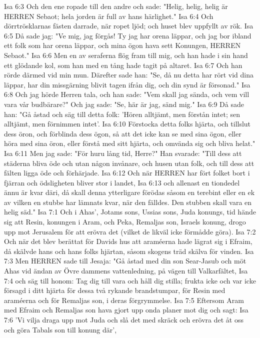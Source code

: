 Isa 6:3  Och den ene ropade till den andre och sade: "Helig, helig, helig är HERREN Sebaot; hela jorden är full av hans härlighet."
Isa 6:4  Och dörrtrösklarnas fästen darrade, när ropet ljöd; och huset blev uppfyllt av rök.
Isa 6:5  Då sade jag: "Ve mig, jag förgås! Ty jag har orena läppar, och jag bor ibland ett folk som har orena läppar, och mina ögon hava sett Konungen, HERREN Sebaot."
Isa 6:6  Men en av seraferna flög fram till mig, och han hade i sin hand ett glödande kol, som han med en tång hade tagit på altaret.
Isa 6:7  Och han rörde därmed vid min mun. Därefter sade han: "Se, då nu detta har rört vid dina läppar, har din missgärning blivit tagen ifrån dig, och din synd är försonad."
Isa 6:8  Och jag hörde Herren tala, och han sade: "Vem skall jag sända, och vem vill vara vår budbärare?" Och jag sade: "Se, här är jag, sänd mig."
Isa 6:9  Då sade han: "Gå åstad och säg till detta folk: 'Hören alltjämt, men förstån intet; sen alltjämt, men förnimmen intet'.
Isa 6:10  Förstocka detta folks hjärta, och tillslut dess öron, och förblinda dess ögon, så att det icke kan se med sina ögon, eller höra med sina öron, eller förstå med sitt hjärta, och omvända sig och bliva helat."
Isa 6:11  Men jag sade: "För huru lång tid, Herre?" Han svarade: "Till dess att städerna bliva öde och utan någon invånare, och husen utan folk, och till dess att fälten ligga öde och förhärjade.
Isa 6:12  Och när HERREN har fört folket bort i fjärran och ödsligheten bliver stor i landet,
Isa 6:13  och allenast en tiondedel ännu är kvar däri, då skall denna ytterligare förödas såsom en terebint eller en ek av vilken en stubbe har lämnats kvar, när den fälldes. Den stubben skall vara en helig säd."
Isa 7:1  Och i Ahas', Jotams sons, Ussias sons, Juda konungs, tid hände sig att Resin, konungen i Aram, och Peka, Remaljas son, Israels konung, drogo upp mot Jerusalem för att erövra det (vilket de likväl icke förmådde göra).
Isa 7:2  Och när det blev berättat för Davids hus att araméerna hade lägrat sig i Efraim, då skälvde hans och hans folks hjärtan, såsom skogens träd skälva för vinden.
Isa 7:3  Men HERREN sade till Jesaja: "Gå åstad med din son Sear-Jasub och möt Ahas vid ändan av Övre dammens vattenledning, på vägen till Valkarfältet,
Isa 7:4  och säg till honom: Tag dig till vara och håll dig stilla; frukta icke och var icke försagd i ditt hjärta för dessa två rykande brandstumpar, för Resin med araméerna och för Remaljas son, i deras förgrymmelse.
Isa 7:5  Eftersom Aram med Efraim och Remaljas son hava gjort upp onda planer mot dig och sagt:
Isa 7:6  'Vi vilja draga upp mot Juda och slå det med skräck och erövra det åt oss och göra Tabals son till konung där',
